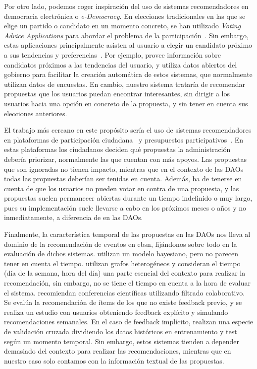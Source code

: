 Por otro lado, podemos coger inspiración del uso de sistemas recomendadores en democracia electrónica o \textit{e-Democracy}. En elecciones tradicionales en las que se elige un partido o candidato en un momento concreto, se han utilizado \textit{Voting Advice Applications} para abordar el problema de la participación~\cite{garzia_research_2016}. Sin embargo, estas aplicaciones principalmente asisten al usuario a elegir un candidato próximo a sus tendencias y preferencias~\cite{garzia_voting_2019}. Por ejemplo, \textcite{teran_fuzzy_2010} provee información sobre candidatos próximos a las tendencias del usuario, y \textcite{buryakov_using_2022} utiliza datos abiertos del gobierno para facilitar la creación automática de estos sistemas, que normalmente utilizan datos de encuestas. En cambio, nuestro sistema trataría de recomendar propuestas que los usuarios puedan encontrar interesantes, sin dirigir a los usuarios hacia una opción en concreto de la propuesta, y sin tener en cuenta sus elecciones anteriores. 

El trabajo más cercano en este propósito sería el uso de sistemas recomendadores en plataformas de participación ciudadana~\cite{cantador_personalized_2017} y presupuestos participativos~\cite{cantador_whats_2018}. En estas plataformas los ciudadanos deciden qué propuestas la administración debería priorizar, normalmente las que cuentan con más apoyos. Las propuestas que son ignoradas no tienen impacto, mientras que en el contexto de las DAOs todas las propuestas deberían ser tenidas en cuenta. Además, ha de tenerse en cuenta de que los usuarios no pueden votar en contra de una propuesta, y las propuestas suelen permanecer abiertas durante un tiempo indefinido o muy largo, pues su implementación suele llevarse a cabo en los próximos meses o años y no inmediatamente, a diferencia de en las DAOs.

Finalmente, la característica temporal de las propuestas en las DAOs nos lleva al dominio de la recomendación de eventos en \gls{ebsn}, fijándonos sobre todo en la evaluación de dichos sistemas. \textcite{zhang_collective_2015} utilizan un modelo bayesiano, pero no parecen tener en cuenta el tiempo. \textcite{pham_general_2015} utilizan grafos heterogéneos y consideran el tiempo (día de la semana, hora del día) una parte esencial del contexto para realizar la recomendación, sin embargo, no se tiene el tiempo en cuenta a la hora de evaluar el sistema. \textcite{minkov_collaborative_2010} recomiendan conferencias científicas utilizando filtrado colaborativo. Se evalúa la recomendación de ítems de los que no existe feedback previo, y se realiza un estudio con usuarios obteniendo feedback explícito y simulando recomendaciones semanales. En el caso de feedback implícito, \textcite{macedo_context-aware_2015} realizan una especie de validación cruzada dividiendo los datos históricos en entrenamiento y test según un momento temporal. Sin embargo, estos sistemas tienden a depender demasiado del contexto para realizar las recomendaciones, mientras que en nuestro caso solo contamos con la información textual de las propuestas.


